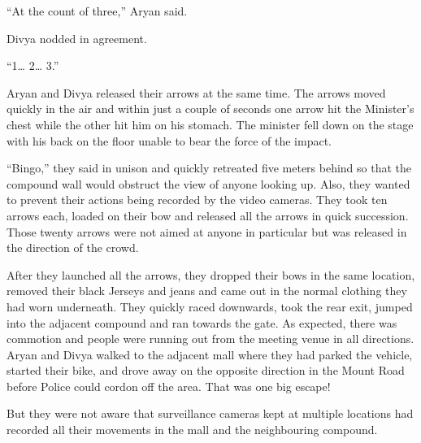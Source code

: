 “At the count of three,” Aryan said.

Divya nodded in agreement.

“1… 2… 3.”

Aryan and Divya released their arrows at the same time. The arrows moved quickly
in the air and within just a couple of seconds one arrow hit the Minister's
chest while the other hit him on his stomach. The minister fell down on the
stage with his back on the floor unable to bear the force of the impact.

“Bingo,” they said in unison and quickly retreated five meters behind so that
the compound wall would obstruct the view of anyone looking up. Also, they
wanted to prevent their actions being recorded by the video cameras. They took
ten arrows each, loaded on their bow and released all the arrows in quick
succession. Those twenty arrows were not aimed at anyone in particular but was
released in the direction of the crowd.

After they launched all the arrows, they dropped their bows in the same
location, removed their black Jerseys and jeans and came out in the normal
clothing they had worn underneath. They quickly raced downwards, took the rear
exit, jumped into the adjacent compound and ran towards the gate. As expected,
there was commotion and people were running out from the meeting venue in all
directions. Aryan and Divya walked to the adjacent mall where they had parked
the vehicle, started their bike, and drove away on the opposite direction in the
Mount Road before Police could cordon off the area. That was one big escape!

But they were not aware that surveillance cameras kept at multiple locations had
recorded all their movements in the mall and the neighbouring compound.